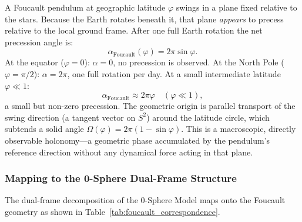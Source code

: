 \documentclass[%
 reprint,
 amsmath,amssymb,
 aps,
 prb,
]{revtex4-2}
\numberwithin{equation}{section}
\theoremstyle{definition}
\theoremstyle{remark}
\begin{document}
A Foucault pendulum at geographic latitude $\varphi$ swings in a plane fixed relative to the stars. Because the Earth rotates beneath it, that plane \emph{appears} to precess relative to the local ground frame. After one full Earth rotation the net precession angle is:
\begin{equation}
\alpha_{\text{Foucault}}(\varphi) = 2\pi\sin\varphi.
\label{eq:foucault}
\end{equation}
At the equator ($\varphi = 0$): $\alpha = 0$, no precession is observed. At the North Pole ($\varphi = \pi/2$): $\alpha = 2\pi$, one full rotation per day. At a small intermediate latitude $\varphi \ll 1$:
\begin{equation}
\alpha_{\text{Foucault}} \approx 2\pi\varphi \quad (\varphi \ll 1),
\label{eq:foucault_small}
\end{equation}
a small but non-zero precession. The geometric origin is parallel transport of the swing direction (a tangent vector on $S^2$) around the latitude circle, which subtends a solid angle $\Omega(\varphi) = 2\pi(1-\sin\varphi)$. This is a macroscopic, directly observable holonomy---a geometric phase accumulated by the pendulum's reference direction without any dynamical force acting in that plane.

\subsubsection{Mapping to the 0-Sphere Dual-Frame Structure}

The dual-frame decomposition of the 0-Sphere Model maps onto the Foucault geometry as shown in Table~\ref{tab:foucault_correspondence}.
\end{document}
